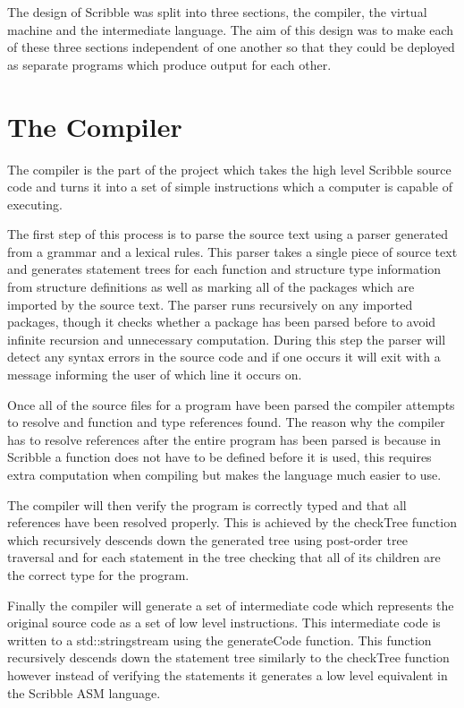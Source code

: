 \documentclass[]{final_report}
\begin{document}
The design of Scribble was split into three sections, the compiler, the virtual machine and the intermediate language. The aim of this design was to make each of these three sections independent of one another so that they could be deployed as separate programs which produce output for each other.

\section{The Compiler}

The compiler is the part of the project which takes the high level Scribble source code and turns it into a set of simple instructions which a computer is capable of executing. 

The first step of this process is to parse the source text using a parser generated from a grammar and a lexical rules. This parser takes a single piece of source text and generates statement trees for each function and structure type information from structure definitions as well as marking all of the packages which are imported by the source text. The parser runs recursively on any imported packages, though it checks whether a package has been parsed before to avoid infinite recursion and unnecessary computation. During this step the parser will detect any syntax errors in the source code and if one occurs it will exit with a message informing the user of which line it occurs on.

Once all of the source files for a program have been parsed the compiler attempts to resolve and function and type references found. The reason why the compiler has to resolve references after the entire program has been parsed is because in Scribble a function does not have to be defined before it is used, this requires extra computation when compiling but makes the language much easier to use.

The compiler will then verify the program is correctly typed and that all references have been resolved properly. This is achieved by the checkTree function which recursively descends down the generated tree using post-order tree traversal and for each statement in the tree checking that all of its children are the correct type for the program.

Finally the compiler will generate a set of intermediate code which represents the original source code as a set of low level instructions. This intermediate code is written to a std::stringstream using the generateCode function. This function recursively descends down the statement tree similarly to the checkTree function however instead of verifying the statements it generates a low level equivalent in the Scribble ASM language.
\end{document}
